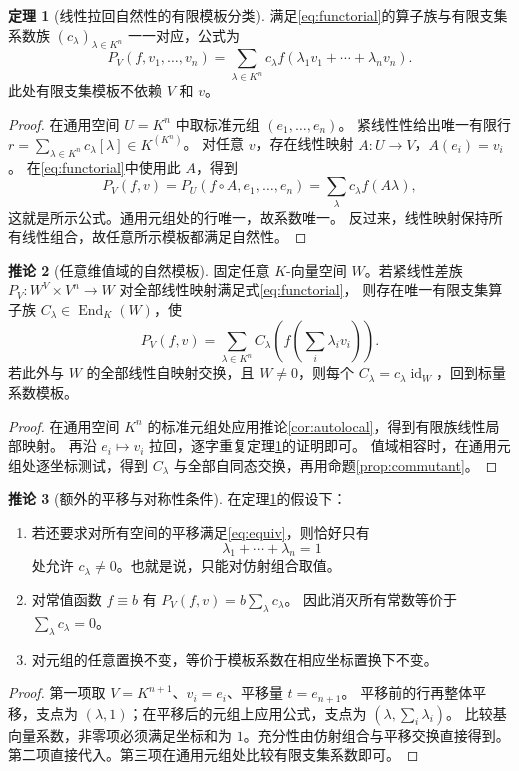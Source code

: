 \documentclass[UTF8,11pt,a4paper]{ctexart}
\theoremstyle{definition}
\newtheorem{theorem}{定理}[section]
\newtheorem{corollary}[theorem]{推论}
\newcommand{\End}{\operatorname{End}}
\newcommand{\id}{\operatorname{id}}
\numberwithin{equation}{section}
\begin{document}
\begin{theorem}[线性拉回自然性的有限模板分类]\label{thm:universal}
满足\eqref{eq:functorial}的算子族与有限支集系数族 $(c_\lambda)_{\lambda\in K^n}$ 一一对应，公式为
\begin{equation}\label{eq:universal}
 P_V(f,v_1,\ldots,v_n)
 =\sum_{\lambda\in K^n}c_\lambda
 f(\lambda_1v_1+\cdots+\lambda_nv_n).
\end{equation}
此处有限支集模板不依赖 $V$ 和 $v$。
\end{theorem}
\begin{proof}
在通用空间 $U=K^n$ 中取标准元组 $(e_1,\ldots,e_n)$。
紧线性性给出唯一有限行
$r=\sum_{\lambda\in K^n}c_\lambda[\lambda]\in K^{(K^n)}$。
对任意 $v$，存在线性映射 $A:U\to V$，$A(e_i)=v_i$。
在\eqref{eq:functorial}中使用此 $A$，得到
\[
 P_V(f,v)=P_U(f\circ A,e_1,\ldots,e_n)
 =\sum_\lambda c_\lambda f(A\lambda),
\]
这就是所示公式。通用元组处的行唯一，故系数唯一。
反过来，线性映射保持所有线性组合，故任意所示模板都满足自然性。
\end{proof}

\begin{corollary}[任意维值域的自然模板]\label{cor:operatornatural}
固定任意 $K$-向量空间 $W$。若紧线性差族
$P_V:W^V\times V^n\to W$ 对全部线性映射满足式\eqref{eq:functorial}，
则存在唯一有限支集算子族 $C_\lambda\in\End_K(W)$，使
\[
 P_V(f,v)=\sum_{\lambda\in K^n}C_\lambda
 \left(f\left(\sum_i\lambda_iv_i\right)\right).
\]
若此外与 $W$ 的全部线性自映射交换，且 $W\ne0$，则每个 $C_\lambda=c_\lambda\id_W$，回到标量系数模板。
\end{corollary}
\begin{proof}
在通用空间 $K^n$ 的标准元组处应用推论\ref{cor:autolocal}，得到有限族线性局部映射。
再沿 $e_i\mapsto v_i$ 拉回，逐字重复定理\ref{thm:universal}的证明即可。
值域相容时，在通用元组处逐坐标测试，得到 $C_\lambda$ 与全部自同态交换，再用命题\ref{prop:commutant}。
\end{proof}

\begin{corollary}[额外的平移与对称性条件]\label{cor:affine}
在定理\ref{thm:universal}的假设下：
\begin{enumerate}
\item 若还要求对所有空间的平移满足\eqref{eq:equiv}，则恰好只有
\[
 \lambda_1+\cdots+\lambda_n=1
\]
处允许 $c_\lambda\ne0$。也就是说，只能对仿射组合取值。
\item 对常值函数 $f\equiv b$ 有 $P_V(f,v)=b\sum_\lambda c_\lambda$。
因此消灭所有常数等价于 $\sum_\lambda c_\lambda=0$。
\item 对元组的任意置换不变，等价于模板系数在相应坐标置换下不变。
\end{enumerate}
\end{corollary}
\begin{proof}
第一项取 $V=K^{n+1}$、$v_i=e_i$、平移量 $t=e_{n+1}$。
平移前的行再整体平移，支点为 $(\lambda,1)$；在平移后的元组上应用公式，支点为 $(\lambda,\sum_i\lambda_i)$。
比较基向量系数，非零项必须满足坐标和为 $1$。充分性由仿射组合与平移交换直接得到。
第二项直接代入。第三项在通用元组处比较有限支集系数即可。
\end{proof}
\end{document}
